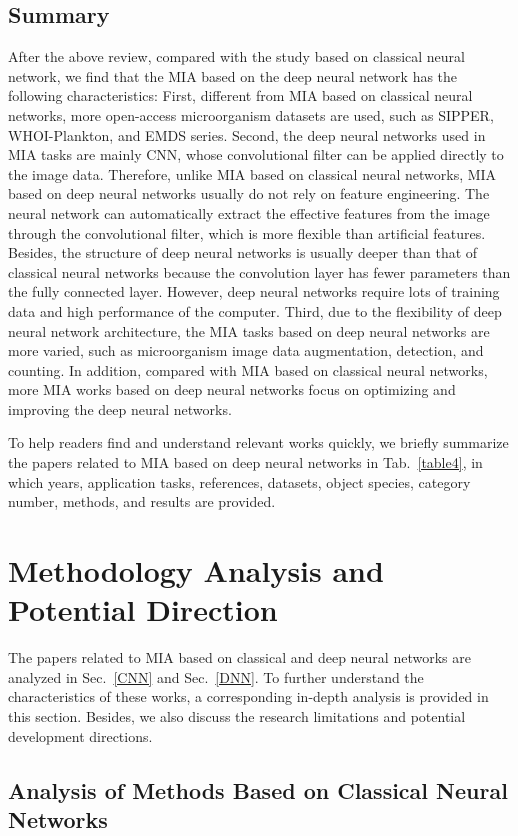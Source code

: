 \subsection{Summary}
After the above review, compared with the study based on classical neural network, we find that the MIA based on the deep neural network has the following characteristics: First, different from MIA based on classical neural networks, more open-access microorganism datasets are used, such as SIPPER, WHOI-Plankton, and EMDS series. Second, the deep neural networks used in MIA tasks are mainly CNN, whose convolutional filter can be applied directly to the image data. Therefore, unlike MIA based on classical neural networks, MIA based on deep neural networks usually do not rely on feature engineering. The neural network can automatically extract the effective features from the image through the convolutional filter, which is more flexible than artificial features. Besides, the structure of deep neural networks is usually deeper than that of classical neural networks because the convolution layer has fewer parameters than the fully connected layer. However, deep neural networks require lots of training data and high performance of the computer. Third, due to the flexibility of deep neural network architecture, the MIA tasks based on deep neural networks are more varied, such as microorganism image data augmentation, detection, and counting. In addition, compared with MIA based on classical neural networks, more MIA works based on deep neural networks focus on optimizing and improving the deep neural networks.

To help readers find and understand relevant works quickly, we briefly summarize the papers related to MIA based on deep neural networks in Tab.~\ref{table4}, in which years, application tasks, references, datasets, object species, category number, methods, and results are provided.


\section{Methodology Analysis and Potential Direction}
\label{MA}
The papers related to MIA based on classical and deep neural networks are analyzed in Sec.~\ref{CNN} and Sec.~\ref{DNN}. To further understand the characteristics of these works, a corresponding in-depth analysis is provided in this section. Besides, we also discuss the research limitations and potential development directions.

\subsection{Analysis of Methods Based on Classical Neural Networks}

